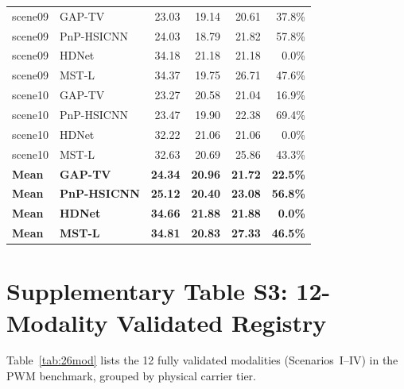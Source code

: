 \documentclass[11pt]{article}
\begin{document}
\begin{footnotesize}
\begin{longtable}{l l r r r r}
\midrule
scene09 & GAP-TV        & 23.03 & 19.14 & 20.61 & 37.8\% \\
scene09 & PnP-HSICNN    & 24.03 & 18.79 & 21.82 & 57.8\% \\
scene09 & HDNet         & 34.18 & 21.18 & 21.18 & 0.0\% \\
scene09 & MST-L         & 34.37 & 19.75 & 26.71 & 47.6\% \\
\midrule
scene10 & GAP-TV        & 23.27 & 20.58 & 21.04 & 16.9\% \\
scene10 & PnP-HSICNN    & 23.47 & 19.90 & 22.38 & 69.4\% \\
scene10 & HDNet         & 32.22 & 21.06 & 21.06 & 0.0\% \\
scene10 & MST-L         & 32.63 & 20.69 & 25.86 & 43.3\% \\
\midrule
\textbf{Mean} & \textbf{GAP-TV}     & \textbf{24.34} & \textbf{20.96} & \textbf{21.72} & \textbf{22.5\%} \\
\textbf{Mean} & \textbf{PnP-HSICNN} & \textbf{25.12} & \textbf{20.40} & \textbf{23.08} & \textbf{56.8\%} \\
\textbf{Mean} & \textbf{HDNet}      & \textbf{34.66} & \textbf{21.88} & \textbf{21.88} & \textbf{0.0\%} \\
\textbf{Mean} & \textbf{MST-L}      & \textbf{34.81} & \textbf{20.83} & \textbf{27.33} & \textbf{46.5\%} \\
\end{longtable}
\end{footnotesize}

\newpage

\section{Supplementary Table S3: 12-Modality Validated Registry}
\label{sec:26mod}

Table~\ref{tab:26mod} lists the 12 fully validated modalities (Scenarios~I--IV)
in the PWM benchmark, grouped by physical carrier tier.
\end{document}
